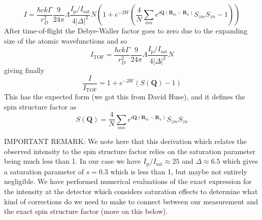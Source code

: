 \documentclass[11pt,letter]{article}
\newcommand{\bv}[1]{\ensuremath{\bm{#1}}}
\newcommand{\iisat}{\ensuremath{I_{\mathrm{p}}/I_{\mathrm{sat}}}}
\begin{document}
\begin{equation}
 I  =
 \frac{\hbar c k \Gamma}{r_{D}^{2}}  
     \frac{9}{24\pi} \Lambda
 \frac{\iisat}{ 4|\Delta|^{2} }  N
  \left(
   1 + 
    e^{-2W} \left( \frac{4}{ N }  \sum_{m n}  
      e^{ i \bv{Q}( \bv{R}_{m} - \bv{R}_{n} ) } 
      S_{zm}S_{zn}  - 1 \right )
     \right)
\end{equation}
After time-of-flight the Debye-Waller factor goes to zero due to the expanding size of the atomic wavefunctions and so  
\begin{equation}
 I_{\mathrm{TOF}} =
 \frac{\hbar c k \Gamma}{r_{D}^{2}}  
     \frac{9}{24\pi} \Lambda
 \frac{\iisat}{ 4|\Delta|^{2} }  N
\end{equation}
giving finally 
\begin{equation}
 \frac{I}{I_{\mathrm{TOF}}} = 1 +  e^{-2W}( S(\bv{Q}) - 1 )
 \label{eq:lowIntensityBragg} 
\end{equation}
This has the expected form (we got this from David Huse), and it defines the spin structure factor as 
\begin{equation}
    S(\bv{Q}) =  \frac{4}{ N }  \sum_{m n}  
      e^{ i \bv{Q}( \bv{R}_{m} - \bv{R}_{n} ) } 
      S_{zm}S_{zn}  
\end{equation}

IMPORTANT REMARK:   We note here that this derivation which relates the
observed intensity to the spin structure factor relies on the saturation
parameter being much less than 1.   In our case we have
$\iisat\approx 25$ and $\Delta\approx 6.5$ which gives a saturation
parameter of $s=0.3$ which is less than 1, but maybe not entirely
negligible. We have performed numerical evaluations of the exact
expression for the intensity at the detector which considers saturation
effects to determine what kind of corrections do we need to make to
connect between our measurement and
the exact spin structure factor (more on this below). 
\end{document}
